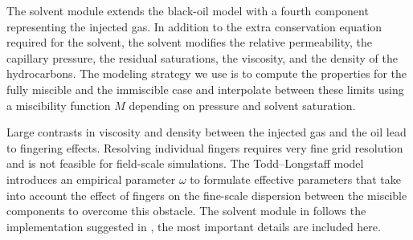 The solvent module extends the black-oil model with a fourth component representing the injected gas. In addition to the extra conservation equation required for the solvent, the solvent modifies the relative permeability, the capillary pressure, the residual saturations, the viscosity, and the density of the hydrocarbons. The modeling strategy we use is to compute the properties for the fully miscible and the immiscible case and interpolate between these limits using a miscibility function $M$ depending on pressure and solvent saturation. 

Large contrasts in viscosity and density between the injected gas and the oil lead to fingering effects. Resolving individual fingers requires very fine grid resolution and is not feasible for field-scale simulations. The Todd--Longstaff model \citep{todd1972development} introduces an empirical parameter $\omega$ to formulate effective parameters that take into account the effect of fingers on the fine-scale dispersion between the miscible components to overcome this obstacle. The solvent module in \opm follows the implementation suggested in \cite{todd1972development, chase1984numerical}, the most important details are included here. 

